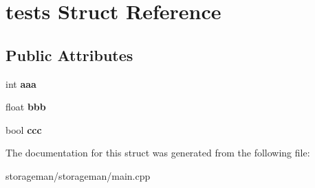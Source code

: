 \hypertarget{structtests}{\section{tests Struct Reference}
\label{structtests}
}
\subsection*{Public Attributes}
\begin{DoxyCompactItemize}
\item 
\hypertarget{structtests_a9ffa3e71f2157cbff7e6e0bbe27a2a35}{int {\bfseries aaa}}\label{structtests_a9ffa3e71f2157cbff7e6e0bbe27a2a35}

\item 
\hypertarget{structtests_aade716ac35e449a5bc1b59ab6b5cb1d5}{float {\bfseries bbb}}\label{structtests_aade716ac35e449a5bc1b59ab6b5cb1d5}

\item 
\hypertarget{structtests_a94f5600f6a9c111e59ed97216bcd7c19}{bool {\bfseries ccc}}\label{structtests_a94f5600f6a9c111e59ed97216bcd7c19}

\end{DoxyCompactItemize}


The documentation for this struct was generated from the following file\-:\begin{DoxyCompactItemize}
\item 
storageman/storageman/main.\-cpp\end{DoxyCompactItemize}
